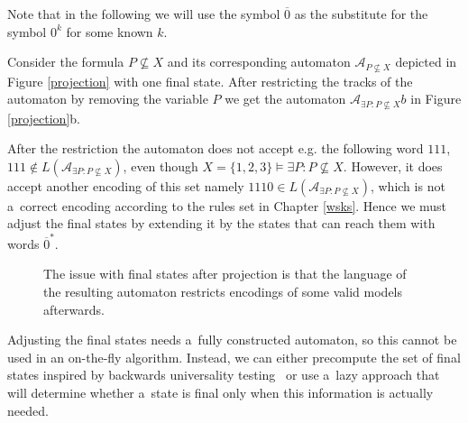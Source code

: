 Note that in the following we will use the symbol $\overline{0}$ as the
substitute for the symbol $0^k$ for some known $k$.
\newpage
\noindent\hrulefill
\begin{example}
 Consider the formula $P \not\subseteq X$ and its corresponding automaton
 $\mathcal{A}_{P \not\subseteq X}$ depicted in Figure \ref{projection} with
 one final state.
 After restricting the tracks of the automaton by removing the variable $P$ we
 get the automaton $\mathcal{A}_{\exists P: P \not\subseteq X}b$ in Figure
 \ref{projection}b.
 
 After the restriction the automaton does not accept e.g. the following word
 $111$, $111 \notin L(\mathcal{A}_{\exists P: P \not\subseteq X})$, even though $X = \{1, 2,
 3\} \models \exists P: P \not\subseteq X$. However, it does accept another
 encoding of this set namely $1110 \in L(\mathcal{A}_{\exists P: P \not\subseteq
 X})$, which is not a~correct encoding according to the rules set in Chapter
 \ref{wsks}. Hence we must adjust the final states by extending it by the states
 that can reach them with words $\overline{0}^*$.
 \begin{figure}[h!]
  \begin{center}
  \end{center}
  \caption{The issue with final states after projection is that
  the language of the resulting automaton restricts encodings
  of some valid models afterwards.}\label{projection}\label{models}
 \end{figure}\end{example}\noindent\hrulefill

Adjusting the final states needs a~fully constructed automaton, so this cannot
be used in an on-the-fly algorithm. Instead, we can either precompute the set of
final states inspired by backwards universality
testing~\cite{backwards-universality} or use a~lazy approach that will determine
whether a~state is final only when this information is actually needed.

